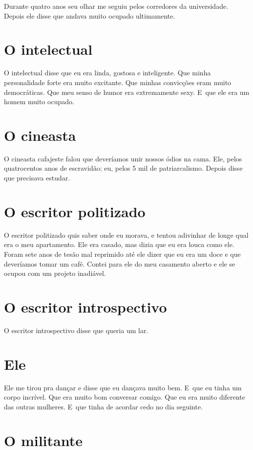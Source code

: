 Durante quatro anos seu olhar me seguiu pelos corredores da
universidade. Depois ele disse que andava muito ocupado ultimamente.

\chapter{O intelectual}

O intelectual disse que eu era linda, gostosa e inteligente. Que minha
personalidade forte era muito excitante. Que minhas convicções eram
muito democráticas. Que meu senso de humor era extremamente sexy. E~que
ele era um homem muito ocupado.

\chapter{O cineasta}

O cineasta cafajeste falou que deveríamos unir nossos ódios na cama.
Ele, pelos quatrocentos anos de escravidão; eu, pelos 5 mil de
patriarcalismo. Depois disse que precisava estudar.

\chapter{O escritor politizado}

O escritor politizado quis saber onde eu morava, e tentou adivinhar de
longe qual era o meu apartamento. Ele era casado, mas dizia que eu era
louca como ele. Foram sete anos de tesão mal reprimido até ele dizer que
eu era um doce e que deveríamos tomar um café. Contei para ele do meu
casamento aberto e ele se ocupou com um projeto inadiável.

\chapter{O escritor introspectivo}

O escritor introspectivo disse que queria um lar.

\chapter{Ele}

Ele me tirou pra dançar e disse que eu dançava muito bem. E~que eu tinha
um corpo incrível. Que era muito bom conversar comigo. Que eu era muito
diferente das outras mulheres. E~que tinha de acordar cedo no dia
seguinte.

\chapter{O militante}

